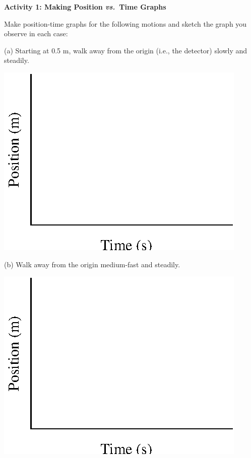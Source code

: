 \textbf{Activity 1: Making Position \textit{vs.}~Time Graphs }

Make position-time graphs for the following motions and sketch the graph you
observe in each case:

(a) Starting at 0.5 m, walk away from the origin (i.e., the detector) slowly
and steadily.

{\par\centering \includegraphics{position/position_fig1.eps} \par}

(b) Walk away from the origin medium-fast and steadily.

{\par\centering \includegraphics{position/position_fig1.eps} \par}

